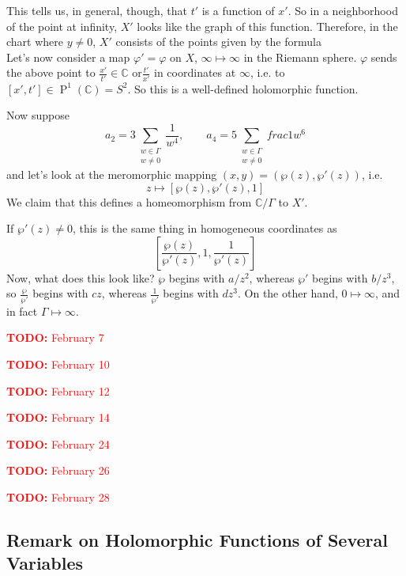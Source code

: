 \documentclass{article}
\newcommand{\mbb}[1]{\mathbb{#1}}
\DeclareMathOperator{\BigP}{P}
\newcommand{\Prj}[2]{\BigP^{#1}({#2})}
\newcommand{\TODO}[1]{\begin{center}\huge{\textcolor{red}{\textbf{TODO:} #1}}\end{center}}
\begin{document}
This tells us, in general, though, that \(t'\) is a function of \(x'\). So in a neighborhood of the point at infinity, \(X'\) looks like the graph of this function.
Therefore, in the chart where \(y \neq 0\), \(X'\) consists of the points given by the formula
\begin{equation}[x', 1, t' = 4x'^3 - 320a_2x'^7 + ...]\end{equation}
Let's now consider a map \(\varphi' = \varphi\) on \(X\), \(\infty \mapsto \infty\) in the Riemann sphere. \(\varphi\) sends the above point to \(\frac{x'}{t'} \in \mbb{C}\) or\(\frac{t'}{x'}\) in coordinates at \(\infty\), i.e. to \([x', t'] \in \Prj{1}{\mbb{C}} = S^2\). So this is a well-defined holomorphic function.

Now suppose
\begin{equation}
a_2 = 3\sum_{\substack{w \in \Gamma \\ w \neq 0}}\frac{1}{w^4},
\qquad a_4 = 5\sum_{\substack{w \in \Gamma \\ w \neq 0}}frac{1}{w^6}
\end{equation}
and let's look at the meromorphic mapping \((x, y) = (\wp(z), \wp'(z))\), i.e.
\begin{equation}z \mapsto [\wp(z), \wp'(z), 1]\end{equation}
We claim that this defines a homeomorphism from \(\mbb{C}/\Gamma\) to \(X'\).

If \(\wp'(z) \neq 0\), this is the same thing in homogeneous coordinates as
\begin{equation}\left[\frac{\wp(z)}{\wp'(z)}, 1, \frac{1}{\wp'(z)}\right]\end{equation}
Now, what does this look like? \(\wp\) begins with \(a/z^2\), whereas \(\wp'\) begins with \(b/z^3\), so \(\frac{\wp}{\wp'}\) begins with \(cz\), whereas \(\frac{1}{\wp'}\) begins with \(dz^3\). On the other hand, \(0 \mapsto \infty\), and in fact \(\Gamma \mapsto \infty\).

\TODO{February 7}

\TODO{February 10}

\TODO{February 12}

\TODO{February 14}

\TODO{February 24}

\TODO{February 26}

\TODO{February 28}

\subsection{Remark on Holomorphic Functions of Several Variables}
\end{document}
